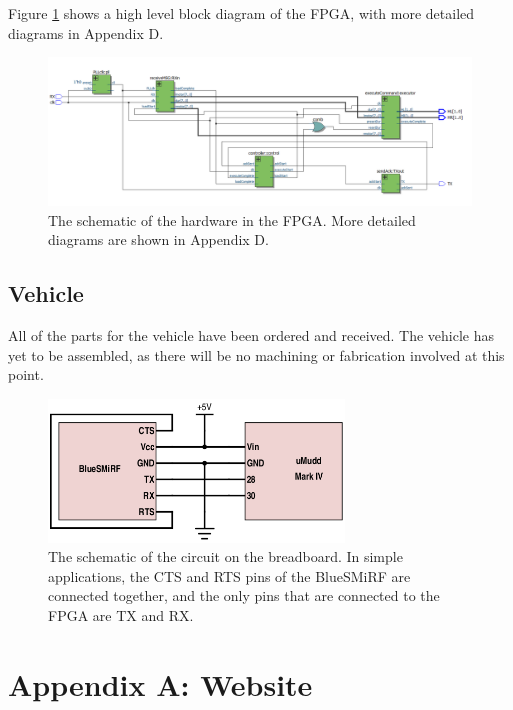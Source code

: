 \documentclass[11pt]{article}
\begin{document}
Figure \ref{fig:fpga} shows a high level block diagram of the FPGA, with more detailed diagrams in Appendix D.

\begin{figure}
\begin{center}
\includegraphics[width=\textwidth]{systemOverview}
\end{center}
\caption{The schematic of the hardware in the FPGA. More detailed diagrams are shown in Appendix D.}
\label{fig:fpga}
\end{figure}

\subsection{Vehicle}
All of the parts for the vehicle have been ordered and received. The vehicle has yet to be assembled, as there will be no machining or fabrication involved at this point.

\begin{figure}
\begin{center}
\includegraphics[width=0.7\textwidth]{breadboard}
\end{center}
\caption{The schematic of the circuit on the breadboard. In simple applications, the CTS and RTS pins of the BlueSMiRF are connected together, and the only pins that are connected to the FPGA are TX and RX.}
\label{fig:breadboard}
\end{figure}



\section{Appendix A: Website}
\end{document}
